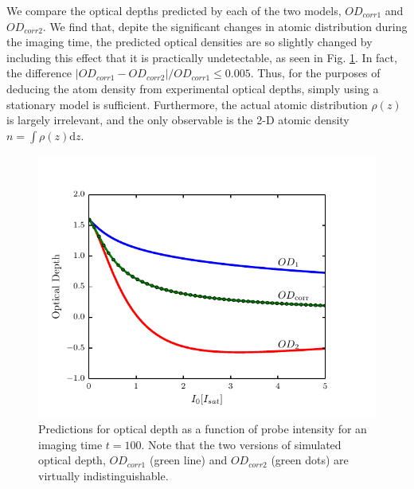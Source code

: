 \documentclass[12pt]{iopart}
\begin{document}
\par We compare the optical depths predicted by each of the two models, $OD_{corr1}$ and $OD_{corr2}$. We find that, depite the significant changes in atomic distribution during the imaging time, the predicted optical densities are so slightly changed by including this effect that it is practically undetectable, as seen in Fig. \ref{fig:atomTravel}. In fact, the difference $\left|OD_{corr1}-OD_{corr2}\right|/OD_{corr1} \le 0.005$. Thus, for the purposes of deducing the atom density from experimental optical depths, simply using a stationary model is sufficient. Furthermore, the actual atomic distribution $\rho(z)$ is largely irrelevant, and the only observable is the 2-D atomic density $n=\int\rho(z)\mathrm{d}z$. 
\begin{figure}
	\includegraphics{figure7.pdf}
\caption{Predictions for optical depth as a function of probe intensity for an imaging time $t=100$\us. Note that the two versions of simulated optical depth, $OD_{corr1}$ (green line) and $OD_{corr2}$ (green dots) are virtually indistinguishable. }  
\label{fig:atomTravel}
\end{figure}
\end{document}
